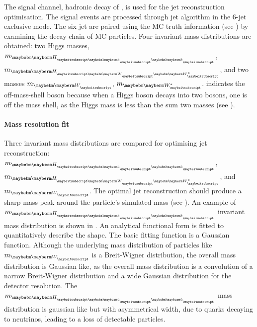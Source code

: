 

The signal channel, hadronic decay of \eeToHHbbWWHad, is used for the jet reconstruction optimisation. The signal events  are processed through \kt jet algorithm  in the 6-jet exclusive mode. The six jet are paired using the MC truth information (see ) by examining the decay chain of MC particles. Four invariant mass distributions are obtained: two Higgs masses, $m_{\Hbb}$, $m_{\HWW}$, and two \PW masses $m_{\PW}$, $m_{\W*}$. \W* indicates the off-mass-shell \PW boson because when a Higgs boson decays into two \PW bosons, one \PW is off the mass shell, as the Higgs mass is less than the sum two \PW masses (see ).

\paragraph{Mass resolution fit}
Three invariant mass distributions are compared for optimising jet reconstruction:  $m_{\Hbb}$, $m_{\HWW}$, and $m_{\PW}$. The optimal jet reconstruction should produce a sharp mass peak around the particle's simulated mass (see ). An example of $m_{\Hbb}$ invariant mass distribution is shown in . An analytical functional form is fitted to quantitatively describe the shape. The basic fitting function is a Gaussian function. Although the underlying mass distribution of particles like $m_{\PW}$ is a Breit-Wigner distribution, the overall mass distribution is Gaussian like, as the overall mass distribution is a convolution of a narrow \PW Breit-Wigner distribution and a wide Gaussian distribution for the detector resolution. The $m_{\Hbb}$  mass distribution is gaussian like but with asymmetrical width, due to \Pbottom quarks decaying to neutrinos, leading to a loss of detectable particles.

